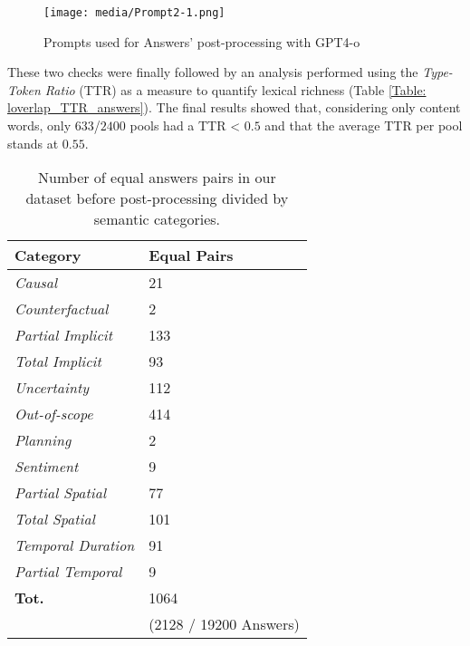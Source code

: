 \begin{figure*}[h]
    \small
  \texttt{[image: media/Prompt2-1.png]}
  \caption{Prompts used for Answers' post-processing with GPT4-o   }
  \label{fig:Prompt_Loverlap}
\end{figure*}
\noindent These two checks were finally followed by an analysis performed using the \textit{Type-Token Ratio} (TTR) as a measure to quantify lexical richness (Table \ref{Table: loverlap_TTR_answers}). The final results showed that, considering only content words, only $633$/$2400$ pools had a TTR < $0.5$ and that the average TTR per pool stands at $0.55$.


\begin{table}
  \small
  \begin{tabular}{ll}
    \toprule
       Category & Equal Pairs \\ \hline
    \textit{Causal} & 21 \\
    \textit{Counterfactual} & 2 \\
    \textit{Partial Implicit} & 133 \\
    \textit{Total Implicit} & 93 \\
    \textit{Uncertainty} & 112 \\
    \textit{Out-of-scope} & 414 \\
    \textit{Planning} & 2 \\
    \textit{Sentiment} & 9 \\
    \textit{Partial Spatial} & 77 \\ 
    \textit{Total Spatial} & 101 \\
    \textit{Temporal Duration} & 91 \\
    \textit{Partial Temporal} & 9 \\
    \bottomrule
    \textbf{Tot.} & 1064 \\
     & (2128 / 19200 Answers) \\

     
  \end{tabular}
  \caption{\label{Table: Equal Strings_answers}
    Number of equal answers pairs in our \\ dataset before post-processing divided by semantic categories.
  }
\end{table}

